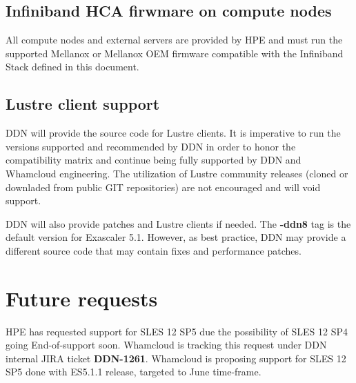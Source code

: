 \documentclass{article}
\begin{document}
\subsection{Infiniband HCA firwmare on compute nodes}
All compute nodes and external servers are provided by HPE and must run the supported Mellanox or Mellanox OEM firmware compatible with the Infiniband Stack defined in this document. 

\subsection{Lustre client support}
DDN will provide the source code for Lustre clients. It is imperative to run the versions supported and recommended by DDN in order to honor the compatibility matrix and continue being fully supported by DDN and Whamcloud engineering. The utilization of Lustre community releases (cloned or downladed from public GIT repositories) are not encouraged and will void support.

DDN will also provide patches and Lustre clients if needed. The \textbf{-ddn8} tag is the default version for Exascaler 5.1. However, as best practice, DDN may provide a different source code that may contain fixes and performance patches.

\section{Future requests}
HPE has requested support for SLES 12 SP5 due the possibility of SLES 12 SP4 going End-of-support soon. Whamcloud is tracking this request under DDN internal JIRA ticket \textbf{DDN-1261}. Whamcloud is proposing support for SLES 12 SP5 done with ES5.1.1 release, targeted to June time-frame. 
\end{document}

